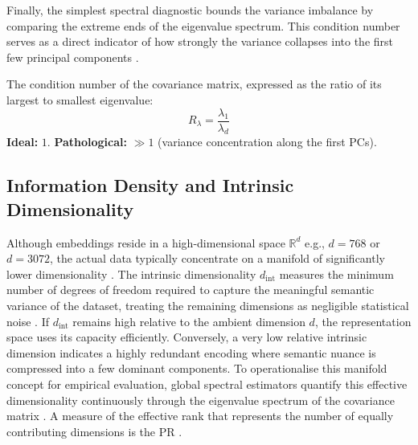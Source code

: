 Finally, the simplest spectral diagnostic bounds the variance imbalance by comparing the extreme ends of the eigenvalue spectrum. This condition number serves as a direct indicator of how strongly the variance collapses into the first few principal components \cite{rudman-etal-2022-isoscore,ethayarajh-2019-contextual}\cite[p.~88~f.]{golub2013matrix}.

\begin{metricbox}
The condition number of the covariance matrix, expressed as the ratio of its largest to smallest eigenvalue:
\begin{equation}
    R_\lambda = \frac{\lambda_1}{\lambda_d}
    \label{met:eigenvalue_ratio}
\end{equation} 
\textbf{Ideal:} $1$. \quad \textbf{Pathological:} $\gg 1$ (variance concentration along the first \acp{PC}).
\end{metricbox}



\subsection{Information Density and Intrinsic Dimensionality}
\label{sec:intrinsic_dim}

Although embeddings reside in a high-dimensional space $\mathbb{R}^d$ e.g., $d=768$ or $d=3072$, the actual data typically concentrate on a manifold of significantly lower dimensionality \cite{Fefferman2016_Manifold}. The intrinsic dimensionality $d_{\mathrm{int}}$ measures the minimum number of degrees of freedom required to capture the meaningful semantic variance of the dataset, treating the remaining dimensions as negligible statistical noise \cite{AnsuiniLLZ19}. If $d_{\mathrm{int}}$ remains high relative to the ambient dimension $d$, the representation space uses its capacity efficiently. Conversely, a very low relative intrinsic dimension indicates a highly redundant encoding where semantic nuance is compressed into a few dominant components. To operationalise this manifold concept for empirical evaluation, global spectral estimators quantify this effective dimensionality continuously through the eigenvalue spectrum of the covariance matrix \cite{AnsuiniLLZ19, Gao2017Multineuronal}. A measure of the effective rank that represents the number of equally contributing dimensions is the \ac{PR} \cite{Gao2017Multineuronal}.

